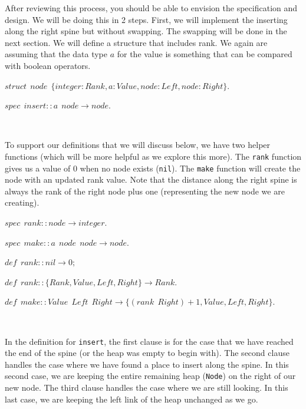 \documentclass[
]{book}
\begin{document}
After reviewing this process, you should be able to envision the specification and design. We will be doing this in 2 steps. First, we will implement the inserting along the right spine but without swapping. The swapping will be done in the next section. We will define a structure that includes rank. We again are assuming that the data type \(a\) for the value is something that can be compared with boolean operators.

\begin{formulabox}
\(struct ~ ~ node ~ ~ \lbrace integer:Rank, a:Value, node:\mathit{Left}, node:Right \rbrace.\)

\(spec ~ ~ insert :: a ~ ~ node \rightarrow node.\)

\end{formulabox}

\(\nonumber\)

To support our definitions that we will discuss below, we have two helper functions (which will be more helpful as we explore this more). The \texttt{rank} function gives us a value of 0 when no node exists (\texttt{nil}). The \texttt{make} function will create the node with an updated rank value. Note that the distance along the right spine is always the rank of the right node plus one (representing the new node we are creating).

\begin{formulabox}
\(spec ~ ~ rank :: node \rightarrow integer.\)

\(spec ~ ~ make :: a ~ ~ node ~ ~ node \rightarrow node.\)

\(\mathit{def} ~ ~ rank :: nil \rightarrow 0;\)

\(\mathit{def} ~ ~ rank :: \lbrace Rank, Value, \mathit{Left}, Right \rbrace \rightarrow Rank.\)

\(\mathit{def} ~ ~ make :: Value ~ ~ \mathit{Left} ~ ~ Right \rightarrow \lbrace (rank ~ ~ Right) + 1, Value, \mathit{Left}, Right \rbrace.\)

\end{formulabox}

\(\nonumber\)

In the definition for \texttt{insert}, the first clause is for the case that we have reached the end of the spine (or the heap was empty to begin with). The second clause handles the case where we have found a place to insert along the spine. In this second case, we are keeping the entire remaining heap (\texttt{Node}) on the right of our new node. The third clause handles the case where we are still looking. In this last case, we are keeping the left link of the heap unchanged as we go.
\end{document}
